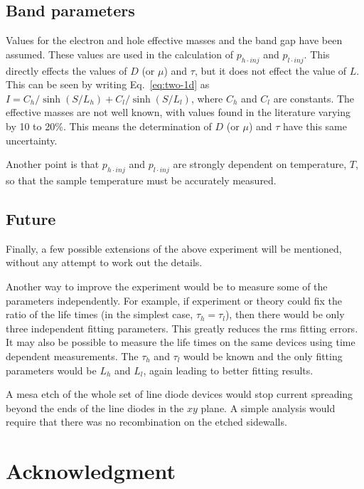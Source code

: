    \subsection{Band parameters}

Values for the electron and hole effective masses and the band gap
 have been assumed.
These values are used in the calculation of $p_{h\cdot inj}$ and
$p_{l\cdot inj}$.
This directly effects the values of $D$ (or $\mu$) and $\tau$, but it does not
effect the value of $L$.
This can be seen by writing Eq.~\ref{eq:two-1d} as
$I=C_h/\sinh(S/L_h)+C_l/\sinh(S/L_l)$, where $C_h$ and $C_l$ are constants.
The effective masses are not well known, with values found in the
 literature varying by 10 to 20\%.
This means the determination of $D$ (or $\mu$) and $\tau$ have this same
uncertainty. 

Another point is that  $p_{h\cdot inj}$ and
$p_{l\cdot inj}$ are strongly dependent on temperature, $T$, so
that the sample temperature must be accurately measured.\\[1ex]

   \subsection{Future}

Finally, a few possible extensions of the above experiment will be
mentioned, without any attempt to work out the details.

Another way to improve the experiment would be to measure some of the
 parameters independently.  For example, if experiment or theory could
fix the ratio of the life times (in the simplest case, $\tau_h=\tau_l$),
then there would be only three independent fitting parameters.
This greatly reduces the rms fitting errors.
It may also be possible to measure the life times on the same devices
using time dependent measurements.  The $\tau_h$ and $\tau_l$ would be
known and the only fitting parameters would be $L_h$ and $L_l$, again leading
to better fitting results.



A mesa etch of the whole set of line diode devices would stop current spreading
beyond the ends of the line diodes in the $xy$ plane.
A simple analysis would require that there was no recombination on the etched sidewalls.

\section*{Acknowledgment}

